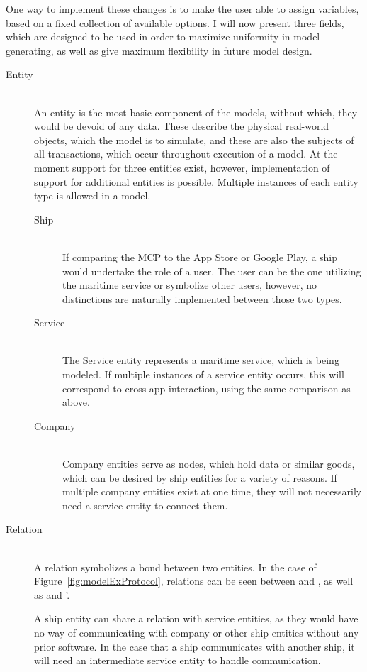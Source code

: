 One way to implement these changes is to make the user able to assign variables, based on a fixed collection of available options. I will now present three fields, which are designed to be used in order to maximize uniformity in model generating, as well as give maximum flexibility in future model design.
\begin{description}
	\item[Entity]\ \\
	An entity is the most basic component of the models, without which, they would be devoid of any data. These describe the physical real-world objects, which the model is to simulate, and these are also the subjects of all transactions, which occur throughout execution of a model. At the moment support for three entities exist, however, implementation of support for additional entities is possible.
	Multiple instances of each entity type is allowed in a model.\newpage
	\begin{description}
		\item[Ship]\ \\
			If comparing the MCP to the App Store or Google Play, a ship would undertake the role of a user. The user can be the one utilizing the maritime service or symbolize other users, however, no distinctions are naturally implemented between those two types.
		\item[Service]\ \\
			The Service entity represents a maritime service, which is being modeled. If multiple instances of a service entity occurs, this will correspond to cross app interaction, using the same comparison as above.
		\item[Company]\ \\
			Company entities serve as nodes, which hold data or similar goods, which can be desired by ship entities for a variety of reasons. If multiple company entities exist at one time, they will not necessarily need a service entity to connect them. 
	\end{description}
	\item[Relation]\ \\
		A relation symbolizes a bond between two entities. In the case of Figure~\ref{fig:modelExProtocol}, relations can be seen between  and , as well as  and '.

		A ship entity can share a relation with service entities, as they would have no way of communicating with company or other ship entities without any prior software. In the case that a ship communicates with another ship, it will need an intermediate service entity to handle communication.


\end{description}
